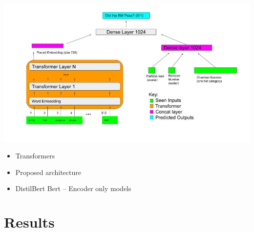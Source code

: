 \documentclass[11pt]{article}
\begin{document}




\includegraphics[width=150mm]{figures/network_architecture.jpg}


\begin{itemize}
  \item Transformers
  \item Proposed architecture
  \item DistilBert Bert  -- Encoder only models
\end{itemize}



\section{Results}
\end{document}
